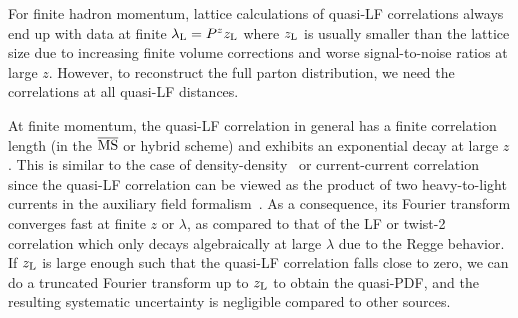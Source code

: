 \documentclass[preprint,12pt]{elsarticle}
\newcommand{\MS}{{\overline{\rm MS}}}
\begin{document}
For finite hadron momentum, lattice calculations of quasi-LF correlations always end up with data at
finite $\lambda_{\rm L}=P^zz_{\rm L}$ where $z_{\rm L}$ is usually smaller than the lattice size due to increasing finite volume corrections and worse signal-to-noise ratios at large $z$. However, to reconstruct the full parton distribution, we need the correlations at all quasi-LF distances.

At finite momentum, the quasi-LF correlation in general has a finite correlation length (in the $\MS$ or hybrid scheme) and exhibits an exponential decay at large $z$. This is similar to the case of density-density~\cite{Burkardt:1994pw} or current-current correlation since the quasi-LF correlation can be viewed as the product of two heavy-to-light currents in the auxiliary field formalism~\cite{Samuel:1978iy,Gervais:1979fv,Arefeva:1980zd,Dorn:1986dt}. As a consequence, its Fourier transform converges fast at finite $z$ or $\lambda$, as compared to that of the LF or twist-2 correlation which only decays algebraically at large $\lambda$ due to the Regge behavior. If $z_{\rm L}$ is large enough such that the quasi-LF correlation falls close to zero, we can do a truncated Fourier transform up to $z_{\rm L}$ to obtain the quasi-PDF, and the resulting systematic uncertainty is negligible compared to other sources.
\end{document}
